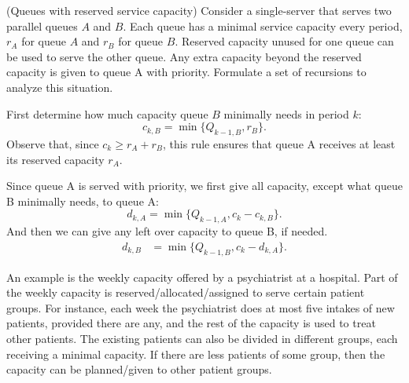 \begin{exercise} 
  (Queues with reserved service capacity) Consider a single-server that
  serves two parallel queues $A$ and $B$. Each queue has a minimal service
  capacity every period, $r_A$ for queue $A$ and $r_B$ for queue $B$. Reserved capacity unused for one queue can be
  used to serve the other queue. Any extra capacity beyond the
  reserved capacity is given to queue A with priority. Formulate a set
  of recursions to analyze this situation.
  \begin{solution}
    First determine how much capacity queue $B$ minimally needs in
    period $k$:
    \begin{equation*}
      c_{k,B} = \min\{Q_{ k-1, B}, r_B\}.
    \end{equation*}
    Observe that, since $c_k \geq r_A + r_B$, this rule ensures that
    queue A receives at least its reserved capacity $r_A$. 

    Since queue A is served with priority, we first give all capacity,
    except what queue B minimally needs, to queue A:
    \begin{equation*}
d_{k,A} = \min\{Q_{k-1, A}, c_k-c_{k,B}\}.
\end{equation*}
And then we can give any left over capacity to queue B, if needed. 
\begin{align*}
d_{k,B} &= \min\{Q_{k-1, B}, c_k-d_{k,A}\}.
\end{align*}

    An example is the weekly capacity offered by a psychiatrist at a
    hospital. Part of the weekly capacity is
    reserved/allocated/assigned to serve certain patient groups. For
    instance, each week the psychiatrist does at most five intakes of
    new patients, provided there are any, and the rest of the capacity
    is used to treat other patients. The existing patients can also be
    divided in different groups, each receiving a minimal capacity. If
    there are less patients of some group, then the capacity can be
    planned/given to other patient groups. 
  \end{solution}
\end{exercise}


